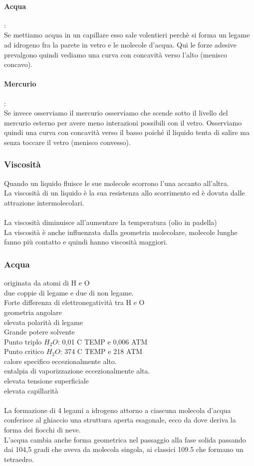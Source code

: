 \paragraph*{Acqua}:\\
Se mettiamo acqua in un capillare esso sale volentieri perchè si forma un legame ad idrogeno fra la parete in vetro e le molecole d’acqua. Qui le forze adesive prevalgono quindi vediamo una curva con concavità verso l’alto (menisco concavo). \\
\paragraph*{Mercurio}:\\
Se invece osserviamo il mercurio osserviamo che scende sotto il livello del mercurio esterno per avere meno interazioni possibili con il vetro. Osserviamo quindi una curva con concavità verso il basso poiché il liquido tenta di salire ma senza toccare il vetro (menisco convesso).
\subsubsection{Viscosità}
Quando un liquido fluisce le sue molecole scorrono l’una accanto all’altra. \\
La viscosità di un liquido è la sua resistenza allo scorrimento ed è dovuta dalle attrazione intermolecolari. \\\\
La viscosità diminuisce all’aumentare la temperatura (olio in padella)\\
La viscosità è anche influenzata dalla geometria molecolare, molecole lunghe fanno più contatto e quindi hanno viscosità maggiori.
\subsubsection{Acqua}
originata da atomi di H e O\\
due coppie di legame e due di non legame. \\
Forte differenza di elettronegatività tra H e O\\
geometria angolare\\
elevata polarità di legame\\
Grande potere solvente\\
Punto triplo $H_2O$: 0,01 C TEMP e 0,006 ATM\\
Punto critico $H_2O$: 374 C TEMP e 218 ATM\\
calore specifico eccezionalmente alto.\\ 
entalpia di vaporizzazione eccezionalmente alta. \\
elevata tensione superficiale\\
elevata capillarità\\\\
La formazione di 4 legami a idrogeno attorno a ciascuna molecola d’acqua conferisce al ghiaccio una struttura aperta esagonale, ecco da dove deriva la forma dei fiocchi di neve. \\
L’acqua cambia anche forma geometrica nel passaggio alla fase solida passando dai 104,5 gradi che aveva da molecola singola, ai classici 109.5 che formano un tetraedro.\\
